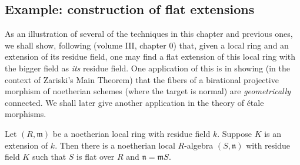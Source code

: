 \subsection{Example: construction of flat extensions}

As an illustration of several of the techniques in this chapter and previous
ones, we shall show, following \cite{EGA} (volume III, chapter 0) that, given a
local ring and an extension of its residue field, one may find a flat
extension of this local ring with the bigger field as \emph{its} residue
field. One application of this is in showing (in the context of Zariski's
Main Theorem) that the fibers of a birational
projective morphism of noetherian schemes (where the target is normal) are
\emph{geometrically} connected.
We shall later give another application in the theory of \'etale morphisms.

\begin{theorem} 
Let $(R, \mathfrak{m})$ be a noetherian local ring with residue field $k$.
Suppose $K$ is an extension of $k$. Then there is a noetherian local
$R$-algebra $(S,
\mathfrak{n})$ with residue field $K$ such that $S$ is flat over $R$ and $\mathfrak{n} =
\mathfrak{m}S$.
\end{theorem} 


